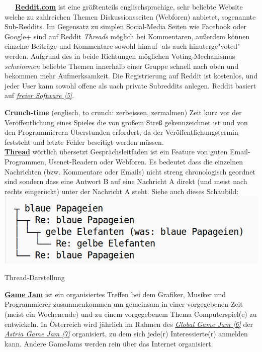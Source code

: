 \documentclass[10pt,a4paper,ngerman,twoside]{article} %
\begin{document}
\begin{multicols}{3}
~~~\href{http://reddit.com}{\textbf{Reddit.com}} ist eine größtenteils englischsprachige, sehr beliebte Website welche zu zahlreichen Themen Diskussionsseiten (Webforen) anbietet, sogenannte Sub-Reddits. Im Gegensatz zu simplen Social-Media Seiten wie Facebook oder Google+ sind auf Reddit \textit{Threads} möglich bei Kommentaren, außerdem können einzelne Beiträge und Kommentare sowohl hinauf- als auch hinuterge"voted" werden. Aufgrund des in beide Richtungen möglichen Voting-Mechanismus \textit{schwimmen} beliebte Themen innerhalb einer Gruppe schnell nach oben und bekommen mehr Aufmerksamkeit. Die Registrierung auf Reddit ist kostenlos, und jeder User kann sowohl offene als uach private Subreddits anlegen. Reddit basiert auf \href{http://github.com/reddit/}{\textit{freier Software [5]}}.

\textbf{Crunch-time} (englisch, to crunch: zerbeissen, zermalmen) Zeit kurz vor der Veröffentlichung eines Spieles die von großem Streß gekennzeichnet ist und von den Programmierern Überstunden erfordert, da der Veröffentlichungstermin feststeht und letzte Fehler beseitigt werden müssen.\\

\href{http://de.wikipedia.org/wiki/Thread_(Internet)}{\textbf{Thread}} wörtlich übersetzt Gesprächsleitfaden ist ein Feature von guten Email-Programmen, Usenet-Readern oder Webforen. Es bedeutet dass die einzelnen Nachrichten (bzw. Kommentare oder Emails) nicht streng chronologisch geordnet sind sondern dass eine Antwort B auf eine Nachricht A direkt (und meist nach rechts eingerückt) unter der Nachricht A steht. Siehe auch dieses Schaubild:
\includegraphics[width=\linewidth]{redditrant/redditrant-threads.png} \\
\begin{center}
\footnotesize{Thread-Darstellung}
\end{center}

\href{https://en.wikipedia.org/wiki/Game_jam}{\textbf{Game Jam}} ist ein organisiertes Treffen bei dem Grafiker, Musiker und Programmierer zusammenkommen um gemeinsam in einer vorgegebenen Zeit (meist ein Wochenende) und zu einem vorgegebenem Thema Computerspiel(e) zu entwickeln. In Österreich wird jährlich im Rahmen des \href{http://globalgamejam.org/}{\textit{Global Game Jam [6]}} der \href{http://austriagamejam.org/}{\textit{Astria Game Jam [7]}} organisiert, zu dem sich jede(r) Interessierte(r) anmelden kann. Andere GameJams werden rein über das Internet organisiert. 



\end{multicols}
\end{document}
